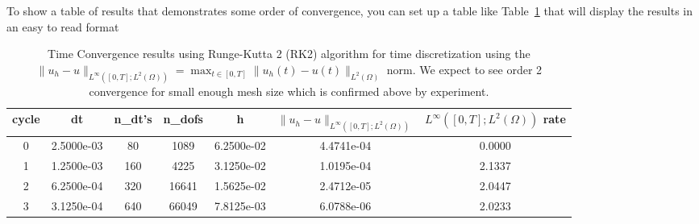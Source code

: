\documentclass[11pt]{article}
\begin{document}
To show a table of results that demonstrates some order of convergence,  you can set up a table like Table~\ref{table:ErrorRatesForTimeDependentProblem} that will display the results in an easy to read format

\begin{table}[h!]
\begin{center}
\begin{tabular}{|c|c|c|c|c|c|c|} 
	\hline
cycle & dt & n\_dt's & n\_dofs & h & $\|u_h-u\|_{L^{\infty}([0,T];L^2(\Omega))}$ & $L^{\infty}([0,T];L^2(\Omega))$ rate \\ \hline
     0 & 2.5000e-03   &   80  &  1089  &  6.2500e-02   &  4.4741e-04     &   0.0000 \\
     1 & 1.2500e-03   &  160  &  4225  &  3.1250e-02   &  1.0195e-04     &   2.1337 \\
     2 & 6.2500e-04   &  320  & 16641  &  1.5625e-02   &  2.4712e-05     &   2.0447 \\
     3 & 3.1250e-04   &  640  & 66049  &  7.8125e-03   &  6.0788e-06     &   2.0233 \\ \hline
\end{tabular}
\end{center}
	\caption{Time Convergence results using Runge-Kutta 2 (RK2) algorithm for time discretization using the $\|u_h-u\|_{L^{\infty}([0,T];L^2(\Omega))} = \max_{t\in[0,T]} \|u_h(t)-u(t)\|_{L^2(\Omega)}$ norm.  We expect to see order 2 convergence for small enough mesh size which is confirmed above by experiment.}
	\label{table:ErrorRatesForTimeDependentProblem}
\end{table}
\end{document}
